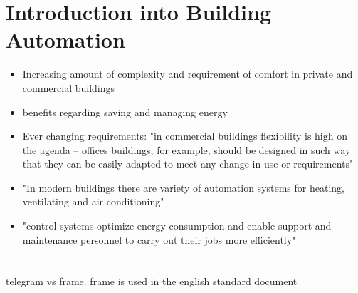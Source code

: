 
\section{Introduction into Building Automation}
	\begin{itemize}
		\item Increasing amount of complexity and requirement of comfort in private and commercial buildings \parencite{Merz2009}

		\item benefits regarding saving and managing energy \parencite{Merz2009}
		\item Ever changing requirements: "in commercial buildings flexibility is high on the agenda -- offices buildings, for example, should be designed in such way that they can be easily adapted to meet any change in use or requirements" \parencite{Merz2009}
		\item "In modern buildings there are variety of automation systems for heating, ventilating and air conditioning" \parencite{Merz2009}
		\item "control systems optimize energy consumption and enable support and maintenance personnel to carry out their jobs more efficiently" \parencite{Merz2009}
		
	\end{itemize}

\section{\knx}
	\alert{telegram vs frame. frame is used in the english standard document}
	
